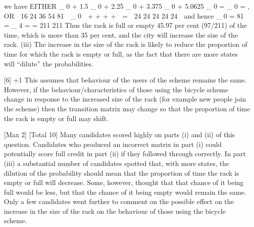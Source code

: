 \documentclass[a4paper,12pt]{article}
\begin{document}
we have
EITHER
\pi_ 0 + 1.5 \pi_ 0 + 2.25 \pi_ 0 + 3.375 \pi_ 0 + 5.0625 \pi_ 0 \;= \pi_ 0 \;= ,
OR
 16 24 36 54 81 
\pi_ 0  + + + +  \;=
 24 24 24 24 24 
and hence
\pi_ 0 \;=
81
\;= \pi_ 4 \;=\;
\;=
211
211
Thus the rack is full or empty 45.97 per cent (97/211) of the time,
which is more than 35 per cent,
and the city will increase the size of the rack.
(iii)
The increase in the size of the rack is likely to reduce the proportion
of time for which the rack is empty or full, as the fact that there are
more states will “dilute” the probabilities.



[6]
+1
This assumes that behaviour of the users of the scheme remains the same. 
However, if the behaviour/characteristics of those using the bicycle
scheme change in response to the increased size of the rack
(for example new people join the scheme)
then the transition matrix may change so that the proportion of time
the rack is empty or full may shift.


[Max 2]
[Total 10]
Many candidates scored highly on parts (i) and (ii) of this question.
Candidates who produced an incorrect matrix in part (i) could potentially score
full credit in part (ii) if they followed through correctly. In part (iii) a substantial
number of candidates spotted that, with more states, the dilution of the
probability should mean that the proportion of time the rack is empty or full will
decrease. Some, however, thought that that chance of it being full would be
less, but that the chance of it being empty would remain the same. Only a
few candidates went further to comment on the possible effect on the
increase in the size of the rack on the behaviour of those using the bicycle
scheme.
\end{document}
